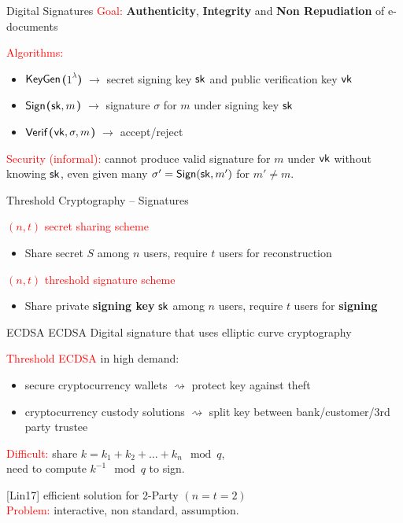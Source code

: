 \documentclass[10pt]{beamer}
\begin{document}
\begin{frame}{Digital Signatures}
\textcolor{red}{Goal:} \textbf{Authenticity}, \textbf{Integrity} and \textbf{Non Repudiation} of e-documents

\textcolor{red}{Algorithms:} 
\begin{itemize}
\item \textcolor{mLightBrown}{\textbf{$\mathsf{KeyGen}$($1^\lambda$)}} $\rightarrow$ secret signing key $\mathsf{sk}$ and public verification key $\mathsf{vk}$
\item \textcolor{mLightBrown}{\textbf{$\mathsf{Sign}$($\mathsf{sk},m$)}} $\rightarrow$ signature $\sigma$ for $m$ under signing key $\mathsf{sk}$
\item \textcolor{mLightBrown}{\textbf{$\mathsf{Verif}$($\mathsf{vk},\sigma, m$)}} $\rightarrow$ \textsf{accept}/\textsf{reject}
\end{itemize}
\textcolor{red}{Security (informal):} cannot produce valid signature for $m$ under $\mathsf{vk}$ without knowing $\mathsf{sk}$, even given many $\sigma'=\mathsf{Sign}(\mathsf{sk},m')$ for $m'\neq m$.
\end{frame}

\begin{frame}{Threshold Cryptography -- Signatures}

\textcolor{red}{$(n,t)$ secret sharing scheme} 
\begin{itemize}
\item Share secret $S$ among $n$ users, require $t$ users for reconstruction
\end{itemize}
\textcolor{red}{$(n,t)$ threshold signature scheme} 
\begin{itemize}
\item Share private \textbf{signing key} $\mathsf{sk}$ among $n$ users, require $t$ users for \textbf{signing}
\end{itemize}
\end{frame}

\begin{frame}{ECDSA}
\textcolor{mLightBrown}{ECDSA} Digital signature that uses elliptic curve cryptography

\textcolor{red}{Threshold ECDSA} in high demand:
\begin{itemize}
\item secure cryptocurrency wallets $\rightsquigarrow$ protect key against theft
\item cryptocurrency custody solutions $\rightsquigarrow$ split key between bank/customer/3rd party trustee
\end{itemize}
\textcolor{red}{Difficult:} share $k = k_1 + k_2 + \dots + k_n \mod q$, \\
\hspace{1.3cm} need to compute $k^{-1} \mod q$ to sign.

\textcolor{darkjunglegreen}{[Lin17]} efficient solution for 2-Party $(n=t=2)$\\
\hspace{1cm} \textcolor{red}{Problem:} interactive, non standard, assumption.

\end{frame}
\end{document}
